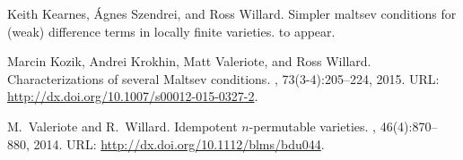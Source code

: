\begin{thebibliography}{1}
Keith Kearnes, \'{A}gnes Szendrei, and Ross Willard.
\newblock Simpler maltsev conditions for (weak) difference terms in locally
  finite varieties.
\newblock to appear.


Marcin Kozik, Andrei Krokhin, Matt Valeriote, and Ross Willard.
\newblock Characterizations of several {M}altsev conditions.
, 73(3-4):205--224, 2015.
\newblock URL: \url{http://dx.doi.org/10.1007/s00012-015-0327-2}.%


M.~Valeriote and R.~Willard.
\newblock Idempotent {$n$}-permutable varieties.
, 46(4):870--880, 2014.
\newblock URL: \url{http://dx.doi.org/10.1112/blms/bdu044}. %





\end{thebibliography}







